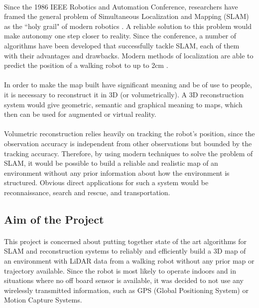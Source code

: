 \documentclass[12pt]{article}
\begin{document}
	\paragraph{}
	Since the 1986 IEEE Robotics and Automation Conference, researchers have framed the general problem of Simultaneous Localization and Mapping (SLAM) as the ``holy grail" of modern robotics \cite{SLAMPartI}. A reliable solution to this problem would make autonomy one step closer to reality. Since the conference, a number of algorithms have been developed that successfully tackle SLAM, each of them with their advantages and drawbacks. Modern methods of localization are able to predict the position of a walking robot to up to 2cm \cite{7041346}.
	
	\paragraph{}
	In order to make the map built have significant meaning and be of use to people, it is necessary to reconstruct it in 3D (or volumetrically). A 3D reconstruction system would give geometric, semantic and graphical meaning to maps, which then can be used for augmented or virtual reality.
	
	\paragraph{}
	Volumetric reconstruction relies heavily on tracking the robot's position, since the observation accuracy is independent from other observations but bounded by the tracking accuracy. Therefore, by using modern techniques to solve the problem of SLAM, it would be possible to build a reliable and realistic map of an environment without any prior information about how the environment is structured. Obvious direct applications for such a system would be reconnaissance, search and rescue, and transportation.
	
	\subsection{Aim of the Project}
	\paragraph{}
	This project is concerned about putting together state of the art algorithms for SLAM and reconstruction systems to reliably and efficiently build a 3D map of an environment with LiDAR data from a walking robot without any prior map or trajectory available. Since the robot is most likely to operate indoors and in situations where no off board sensor is available, it was decided to not use any wirelessly transmitted information, such as GPS (Global Positioning System) or Motion Capture Systems.
	
\end{document}
